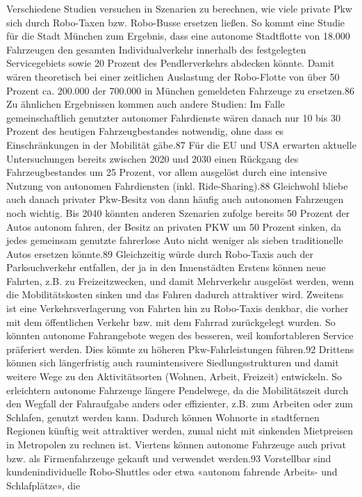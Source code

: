 Verschiedene Studien versuchen in Szenarien zu berechnen, wie viele private
Pkw sich durch Robo-Taxen bzw. Robo-Busse ersetzen ließen. So kommt eine Studie für die Stadt München zum Ergebnis, dass eine autonome Stadtflotte von 18.000
Fahrzeugen den gesamten Individualverkehr innerhalb des festgelegten Servicegebiets sowie 20 Prozent des Pendlerverkehrs abdecken könnte. Damit wären
theoretisch bei einer zeitlichen Auslastung der Robo-Flotte von über 50 Prozent
ca. 200.000 der 700.000 in München gemeldeten Fahrzeuge zu ersetzen.86
Zu ähnlichen Ergebnissen kommen auch andere Studien: Im Falle gemeinschaftlich genutzter autonomer Fahrdienste wären danach nur 10 bis 30 Prozent
des heutigen Fahrzeugbestandes notwendig, ohne dass es Einschränkungen in der
Mobilität gäbe.87 Für die EU und USA erwarten aktuelle Untersuchungen bereits
zwischen 2020 und 2030 einen Rückgang des Fahrzeugbestandes um 25 Prozent,
vor allem ausgelöst durch eine intensive Nutzung von autonomen Fahrdiensten
(inkl. Ride-Sharing).88 Gleichwohl bliebe auch danach privater Pkw-Besitz von
dann häufig auch autonomen Fahrzeugen noch wichtig. Bis 2040 könnten anderen
Szenarien zufolge bereits 50 Prozent der Autos autonom fahren, der Besitz an privaten PKW um 50 Prozent sinken, da jedes gemeinsam genutzte fahrerlose Auto
nicht weniger als sieben traditionelle Autos ersetzen könnte.89 Gleichzeitig würde
durch Robo-Taxis auch der Parksuchverkehr entfallen, der ja in den Innenstädten
Erstens können neue Fahrten, z.B. zu Freizeitzwecken, und damit Mehrverkehr
ausgelöst werden, wenn die Mobilitätskosten sinken und das Fahren dadurch
attraktiver wird.
Zweitens ist eine Verkehrsverlagerung von Fahrten hin zu Robo-Taxis denkbar,
die vorher mit dem öffentlichen Verkehr bzw. mit dem Fahrrad zurückgelegt
wurden. So könnten autonome Fahrangebote wegen des besseren, weil komfortableren Service präferiert werden. Dies könnte zu höheren Pkw-Fahrleistungen führen.92
Drittens können sich längerfristig auch raumintensivere Siedlungsstrukturen und damit weitere Wege zu den Aktivitätsorten (Wohnen, Arbeit, Freizeit) entwickeln. So erleichtern autonome Fahrzeuge längere Pendelwege, da
die Mobilitätszeit durch den Wegfall der Fahraufgabe anders oder effizienter,
z.B. zum Arbeiten oder zum Schlafen, genutzt werden kann. Dadurch können
Wohnorte in stadtfernen Regionen künftig weit attraktiver werden, zumal nicht
mit sinkenden Mietpreisen in Metropolen zu rechnen ist.
Viertens können autonome Fahrzeuge auch privat bzw. als Firmenfahrzeuge gekauft und verwendet werden.93 Vorstellbar sind kundenindividuelle
Robo-Shuttles oder etwa «autonom fahrende Arbeits- und Schlafplätze», die
